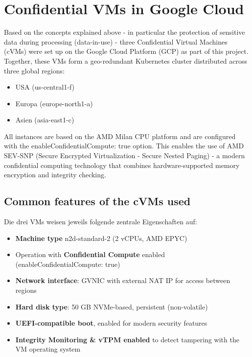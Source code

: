\section{Confidential VMs in Google Cloud}

Based on the concepts explained above - in particular the protection of sensitive data during processing (data-in-use) - three Confidential Virtual Machines (cVMs) were set up on the Google Cloud Platform (GCP) as part of this project. Together, these VMs form a geo-redundant Kubernetes cluster distributed across three global regions:

\begin{itemize}
  \item USA (us-central1-f)
  \item Europa (europe-north1-a)
  \item Asien (asia-east1-c)
\end{itemize}

All instances are based on the AMD Milan CPU platform and are configured with the enableConfidentialCompute: true option. This enables the use of AMD SEV-SNP (Secure Encrypted Virtualization - Secure Nested Paging) - a modern confidential computing technology that combines hardware-supported memory encryption and integrity checking.

\subsection{Common features of the cVMs used}

Die drei VMs weisen jeweils folgende zentrale Eigenschaften auf:

\begin{itemize}
  \item \textbf{Machine type} n2d-standard-2 (2 vCPUs, AMD EPYC)
\item Operation with \textbf{Confidential Compute} enabled (enableConfidentialCompute: true)
\item \textbf{Network interface}: GVNIC with external NAT IP for access between regions
\item \textbf{Hard disk type}: 50 GB NVMe-based, persistent (non-volatile)  
\item \textbf{UEFI-compatible boot}, enabled for modern security features
\item \textbf{Integrity Monitoring \& vTPM enabled} to detect tampering with the VM operating system
\end{itemize}

